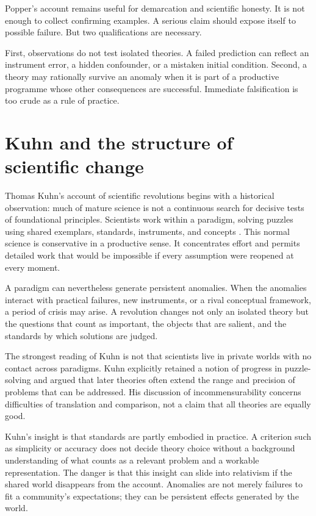 Popper's account remains useful for demarcation and scientific honesty. It is
not enough to collect confirming examples. A serious claim should expose
itself to possible failure. But two qualifications are necessary.

First, observations do not test isolated theories. A failed prediction can
reflect an instrument error, a hidden confounder, or a mistaken initial
condition. Second, a theory may rationally survive an anomaly when it is part
of a productive programme whose other consequences are successful. Immediate
falsification is too crude as a rule of practice.

\section{Kuhn and the structure of scientific change}

Thomas Kuhn's account of scientific revolutions begins with a historical
observation: much of mature science is not a continuous search for decisive
tests of foundational principles. Scientists work within a paradigm, solving
puzzles using shared exemplars, standards, instruments, and concepts
\citep{kuhn1962}. This normal science is conservative in a productive sense.
It concentrates effort and permits detailed work that would be impossible if
every assumption were reopened at every moment.

A paradigm can nevertheless generate persistent anomalies. When the anomalies
interact with practical failures, new instruments, or a rival conceptual
framework, a period of crisis may arise. A revolution changes not only an
isolated theory but the questions that count as important, the objects that
are salient, and the standards by which solutions are judged.

The strongest reading of Kuhn is not that scientists live in private worlds
with no contact across paradigms. Kuhn explicitly retained a notion of
progress in puzzle-solving and argued that later theories often extend the
range and precision of problems that can be addressed. His discussion of
incommensurability concerns difficulties of translation and comparison, not a
claim that all theories are equally good.

Kuhn's insight is that standards are partly embodied in practice. A criterion
such as simplicity or accuracy does not decide theory choice without a
background understanding of what counts as a relevant problem and a workable
representation. The danger is that this insight can slide into relativism if
the shared world disappears from the account. Anomalies are not merely
failures to fit a community's expectations; they can be persistent effects
generated by the world.

